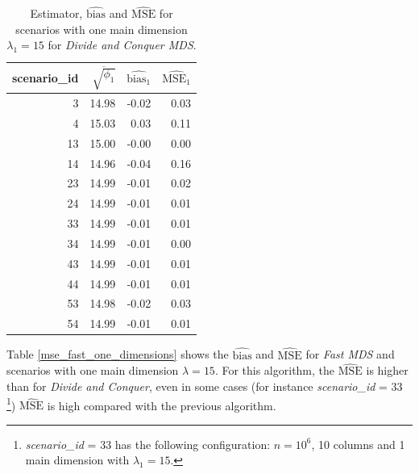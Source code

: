 \documentclass[11pt]{report}
\begin{document}
\begin{table}[ht]
\centering
\begin{tabular}{rrrr}
 scenario\_id & $\overline{\sqrt{\phi_1}}$ & $\widehat{\mbox{bias}_1}$ & $\widehat{\mbox{MSE}_1}$ \\ 
  \hline
  3 & 14.98 & -0.02 & 0.03 \\ 
  4 & 15.03 & 0.03 & 0.11 \\ 
  13 & 15.00 & -0.00 & 0.00 \\ 
  14 & 14.96 & -0.04 & 0.16 \\ 
  23 & 14.99 & -0.01 & 0.02 \\ 
  24 & 14.99 & -0.01 & 0.01 \\ 
  33 & 14.99 & -0.01 & 0.01 \\ 
  34 & 14.99 & -0.01 & 0.00 \\ 
  43 & 14.99 & -0.01 & 0.01 \\ 
  44 & 14.99 & -0.01 & 0.01 \\ 
  53 & 14.98 & -0.02 & 0.03 \\ 
  54 & 14.99 & -0.01 & 0.01 \\ 
   \hline
\end{tabular}
\caption{Estimator, $\widehat{\mbox{bias}}$ and $\widehat{\mbox{MSE}}$ for scenarios with one main dimension $\lambda_1 = 15$ for \textit{Divide and Conquer MDS}.}
\label{mse_divide_one_dimensions}
\end{table}

\indent Table \ref{mse_fast_one_dimensions} shows the $\widehat{\mbox{bias}}$ 
and $\widehat{\mbox{MSE}}$ for \textit{Fast MDS} and scenarios with one main 
dimension $\lambda = 15$. For this algorithm, the $\widehat{\mbox{MSE}}$ is
higher than for \textit{Divide and Conquer}, even in some cases 
(for instance \textit{scenario\_id}  = 33 \footnote{\textit{scenario\_id} = 33 
has the following configuration: $n=10^6$, 10 columns and 1 main dimension 
with $\lambda_1 = 15$.})
$\widehat{\mbox{MSE}}$ is high compared with the previous algorithm. 
\end{document}
